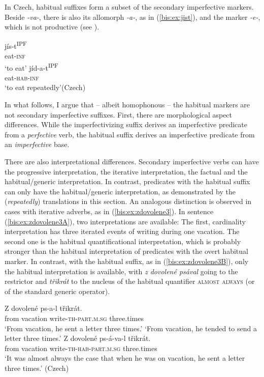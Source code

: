 \documentclass[output=paper]{langscibook}
\begin{document}
\noindent In Czech, habitual suffixes form a subset of the secondary imperfective markers. Beside \textit{-va-}, there is also its allomorph \textit{-a-}, as in (\ref{bis:ex:jist}), and the marker \textit{-e-}, which is not productive (see \citealt{Petr1986}).

\ea\label{bis:ex:jist}
\ea\label{bis:ex:jistA} \gll 
jís-t\textsuperscript{IPF} \\ 
eat-\textsc{inf} \\
\glt ‘to eat’
\ex\label{bis:ex:jidatB} \gll jíd-a-t\textsuperscript{IPF} \\
eat-\textsc{hab}-\textsc{inf} \\
\glt ‘to eat repeatedly’\hfill (Czech)
\z
\z

\noindent In what follows, I argue that – albeit homophonous – the habitual markers are not secondary imperfective suffixes. First, there are morphological aspect differences. While the imperfectivizing suffix derives an imperfective predicate from a \textit{perfective} verb, the habitual suffix derives an imperfective predicate from an \textit{imperfective} base.

There are also interpretational differences. Secondary imperfective verbs can have the progressive interpretation, the iterative interpretation, the factual and the habitual/generic interpretation. In contrast, predicates with the habitual suffix can only have the habitual/generic interpretation, as demonstrated by the (\textit{repeatedly}) translations in this section. An analogous distinction is observed in cases with iterative adverbs, as in (\ref{bis:ex:zdovolene3}). In sentence (\ref{bis:ex:zdovolene3A}), two interpretations are available: The first, cardinality interpretation has three iterated events of writing during one vacation. The second one is the habitual quantificational interpretation, which is probably stronger than the habitual interpretation of predicates with the overt habitual marker. In contrast, with the habitual suffix, as in (\ref{bis:ex:zdovolene3B}), only the habitual interpretation is available, with \textit{z dovolené psával} going to the restrictor and \textit{třikrát} to the nucleus of the habitual quantifier \textsc{almost always} (or of the standard generic operator).

\ea\label{bis:ex:zdovolene3}
\ea\label{bis:ex:zdovolene3A}
\gll 
Z dovolené ps-a-l třikrát. \\ 
from vacation write-\textsc{th}-\textsc{part.m.sg} three.times\\
\glt ‘From vacation, he sent a letter three times.’
\glt ‘From vacation, he tended to send a letter three times.’
\ex\label{bis:ex:zdovolene3B}
\gll 
Z dovolené ps-á-va-l třikrát. \\ 
from vacation write-\textsc{th}-\textsc{hab}-\textsc{part.m.sg} three.times\\
\glt ‘It was almost always the case that when he was on vacation, he sent a letter three times.’
\hfill (Czech)
\z
\z
\end{document}
